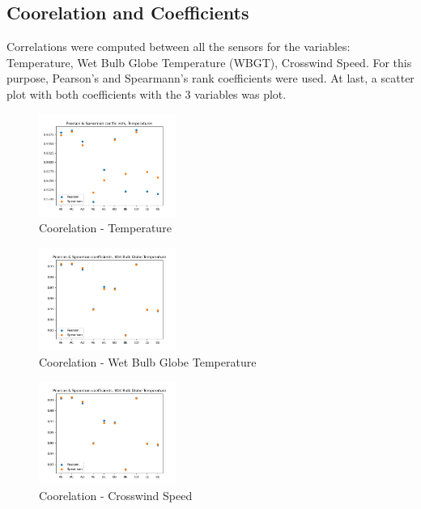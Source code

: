 \documentclass[a4paper,12pt]{article} %
\begin{document}
\subsection{Coorelation and Coefficients}
Correlations were computed between all the sensors for the variables: Temperature, Wet Bulb Globe Temperature (WBGT), Crosswind Speed. For this purpose, Pearson’s and Spearmann’s rank coefficients were used. At last, a scatter plot with both coefficients with the 3 variables was plot.
\begin{figure}[H]   
	\centering 
	\includegraphics[width=0.4\textwidth]{Figure_15.png}
	\caption{Coorelation - Temperature} 
\end{figure}
\begin{figure}[H]   
	\centering 
	\includegraphics[width=0.4\textwidth]{Figure_16.png}
	\caption{Coorelation -  Wet Bulb Globe Temperature} 
\end{figure}
\begin{figure}[H]   
	\centering 
	\includegraphics[width=0.4\textwidth]{Figure_16.png}
	\caption{Coorelation -  Crosswind Speed} 
\end{figure}
\vspace{7mm}
\end{document}
